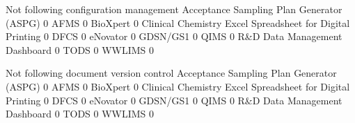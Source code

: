 \documentclass{article}
\begin{document}
\begin{Schunk}
\begin{Soutput}
                                                            Not following configuration management
  Acceptance Sampling Plan Generator (ASPG)                                                      0
  AFMS                                                                                           0
  BioXpert                                                                                       0
  Clinical Chemistry Excel Spreadsheet for Digital Printing                                      0
  DFCS                                                                                           0
  eNovator                                                                                       0
  GDSN/GS1                                                                                       0
  QIMS                                                                                           0
  R&D Data Management Dashboard                                                                  0
  TODS                                                                                           0
  WWLIMS                                                                                         0
                                                           
                                                            Not following document version control
  Acceptance Sampling Plan Generator (ASPG)                                                      0
  AFMS                                                                                           0
  BioXpert                                                                                       0
  Clinical Chemistry Excel Spreadsheet for Digital Printing                                      0
  DFCS                                                                                           0
  eNovator                                                                                       0
  GDSN/GS1                                                                                       0
  QIMS                                                                                           0
  R&D Data Management Dashboard                                                                  0
  TODS                                                                                           0
  WWLIMS                                                                                         0
                                                           

\end{Soutput}
\end{Schunk}
\end{document}
